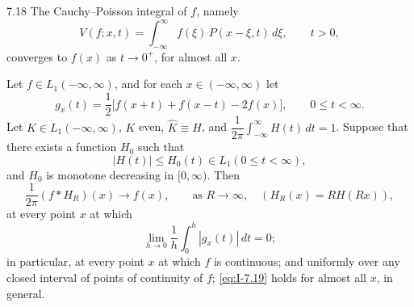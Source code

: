 \begin{nstmt}{7.18}\label{eq:I-7.18}
The Cauchy--Poisson integral of $f$, namely
\[
V(f;x,t)=\int_{-\infty}^{\infty}f(\xi)\,P(x-\xi,t)\,d\xi,\qquad t>0,
\]
converges to $f(x)$ as $t\to 0^+$, for almost all $x$.
\end{nstmt}

\begin{theorem}\label{thm:I-10}
Let $f\in L_1(-\infty,\infty)$, and for each $x\in(-\infty,\infty)$ let
\begin{equation*}
g_x(t)=\frac12\bigl[f(x+t)+f(x-t)-2f(x)\bigr],\qquad 0\le t<\infty.
\end{equation*}
Let $K\in L_1(-\infty,\infty)$, $K$ even, $\hat K\equiv H$, and $\dfrac{1}{2\pi}\int_{-\infty}^{\infty}H(t)\,dt=1$. Suppose that there exists a function $H_0$ such that
\begin{equation*}
|H(t)|\le H_0(t)\in L_1(0\le t<\infty),
\end{equation*}
and $H_0$ is monotone decreasing in $[0,\infty)$. Then
\begin{equation}\tag{7.19}\label{eq:I-7.19}
\frac{1}{2\pi}(f*H_R)(x)\to f(x),\qquad\text{as }R\to\infty,\quad(H_R(x)=RH(Rx)),
\end{equation}
at every point $x$ at which
\begin{equation}\label{eq:I-7.20}\tag{7.20}
\lim_{h\to 0}\frac{1}{h}\int_0^h|g_x(t)|\,dt=0;
\end{equation}
in particular, at every point $x$ at which $f$ is continuous; and uniformly over any closed interval of points of continuity of $f$; \eqref{eq:I-7.19} holds for almost all $x$, in general.
\end{theorem}

